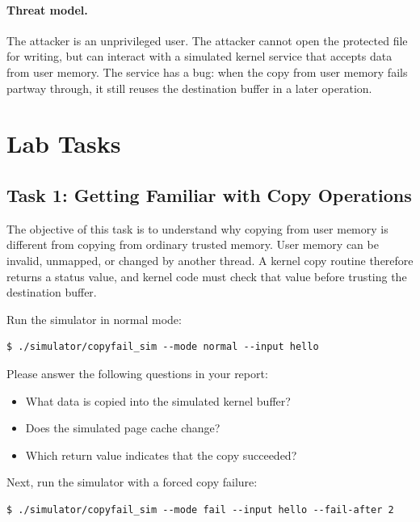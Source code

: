 \paragraph{Threat model.}
The attacker is an unprivileged user. The attacker cannot open the protected
file for writing, but can interact with a simulated kernel service that accepts
data from user memory. The service has a bug: when the copy from user memory
fails partway through, it still reuses the destination buffer in a later
operation.


\section{Lab Tasks}

\subsection{Task 1: Getting Familiar with Copy Operations}

The objective of this task is to understand why copying from user memory is
different from copying from ordinary trusted memory. User memory can be invalid,
unmapped, or changed by another thread. A kernel copy routine therefore returns
a status value, and kernel code must check that value before trusting the
destination buffer.

Run the simulator in normal mode:

\begin{lstlisting}
$ ./simulator/copyfail_sim --mode normal --input hello
\end{lstlisting}

Please answer the following questions in your report:

\begin{itemize}[noitemsep]
\item What data is copied into the simulated kernel buffer?
\item Does the simulated page cache change?
\item Which return value indicates that the copy succeeded?
\end{itemize}

Next, run the simulator with a forced copy failure:

\begin{lstlisting}
$ ./simulator/copyfail_sim --mode fail --input hello --fail-after 2
\end{lstlisting}

